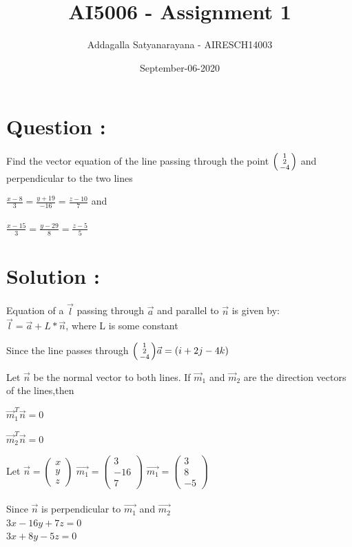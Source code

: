 \documentclass{article}
\title{AI5006 - Assignment 1}
\author{Addagalla Satyanarayana - AIRESCH14003 }
\date{September-06-2020}
\begin{document}
	\maketitle
	\section*{Question :}

{\Large Find the vector equation of the line passing through the point 	
$\begin{psmallmatrix}1 \\2 \\-4	\end{psmallmatrix}$
and perpendicular to the two lines

$\frac{x-8}{3} = \frac{y+19}{-16}= \frac{z-10}{7} $ and\\\\
$\frac{x-15}{3} = \frac{y-29}{8}= \frac{z-5}{5} $\\

\section*{Solution :}

Equation of a $\vec{l}$ passing through $\vec{a}$ and parallel to  $\vec{n}$ is given by:\\
$\vec{l} =\vec{a} + L*\vec{n} $, where L is some constant

Since the line passes through $\begin{psmallmatrix}	1 \\2 \\-4\end{psmallmatrix} \\
\vec{a} = (i + 2j - 4k)$

Let $\vec{n}$ be the normal vector to both lines. If $\vec{m}_1$ and $\vec{m}_2$ are the direction vectors of the lines,then

$\vec{m}_1^T\vec{n} = 0$

$\vec{m}_2^T\vec{n} = 0$

Let $\vec{n} = \begin{pmatrix} x \\ y \\ z\end{pmatrix} $
$\vec{m_1} = \begin{pmatrix} 3 \\ -16 \\ 7\end{pmatrix} $
$\vec{m_1} = \begin{pmatrix} 3 \\ 8 \\ -5\end{pmatrix} $\\\\
Since  $\vec{n}$ is perpendicular to $\vec{m_1}$ and $\vec{m_2}$ \\
$3x -16y + 7z = 0$\\ 
$3x + 8y - 5z = 0$\\

}
\end{document}
